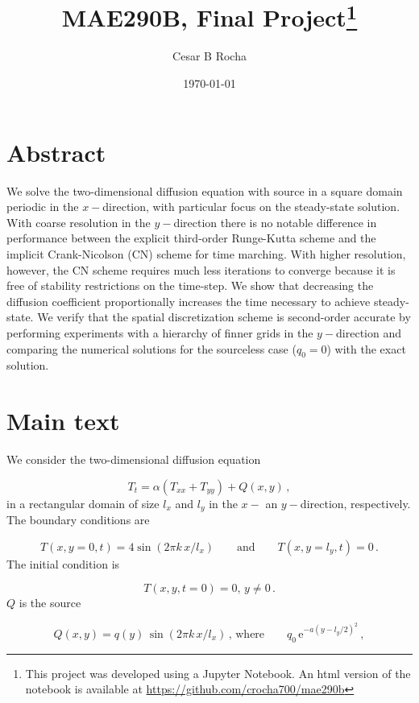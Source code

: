 \documentclass[11pt]{article}
\title{MAE290B, Final Project\footnote{This project was developed using a Jupyter Notebook. An html version of the notebook is available at \href{https://github.com/crocha700/mae290b}{https://github.com/crocha700/mae290b}}}
\author{Cesar B Rocha}
\date{\today}
\newcommand{\ee}{\mathrm{e}}
\newcommand{\com}{\, ,}
\newcommand{\per}{\, .}
\def\beq{\begin{equation}}
\def\eeq{\end{equation}}
\begin{document}
\maketitle

\section*{Abstract}

We solve the two-dimensional diffusion equation with source in a square domain periodic in the $x-$direction, with particular focus on the steady-state solution. With coarse resolution in the $y-$direction there is no notable difference in performance between the explicit third-order Runge-Kutta scheme and the implicit Crank-Nicolson (CN) scheme for time marching. With higher resolution, however, the CN scheme requires much less iterations to converge because it is free of stability restrictions on the time-step. We show that decreasing the diffusion coefficient proportionally increases the time necessary to achieve steady-state. We verify that the spatial discretization scheme is second-order accurate by performing experiments with a hierarchy of finner grids in the $y-$direction and comparing the numerical solutions for the sourceless case ($q_0=0$) with the exact solution.

\section*{Main text}

\noindent We consider the two-dimensional diffusion equation 

\beq
\label{exact_eqn}
T_t = \alpha\left(T_{xx}+T_{yy}\right) + Q(x,y)\com
\eeq
in a rectangular domain of size $l_x$ and $l_y$ in the $x-$ an $y-$direction, respectively. The boundary conditions are


\beq
\label{bc_eqn}
T(x,y=0,t) = 4\sin\left(2\pi k\,x/l_x\right)\qquad \text{and}\qquad T(x,y=l_y,t) = 0\per
\eeq
The initial condition is

\beq
\label{ic_eqn}
T(x,y,t=0) = 0, \,y\neq0\per
\eeq
$Q$ is the source

\beq
\label{ic_eqn}
Q(x,y) = q(y)\,\sin\left(2\pi k\,x/l_x\right)\,,\, \text{where}\qquad q_0\,\ee^{-a(y-l_y/2)^2}\com
\eeq
\end{document}
